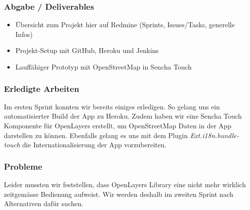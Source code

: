 \subsubsection{Abgabe / Deliverables}

\begin{itemize}
	\item Übersicht zum Projekt hier auf Redmine (Sprints, Issues/Tasks, generelle Infos)
	\item Projekt-Setup mit GitHub, Heroku und Jenkins
	\item Lauffähiger Prototyp mit OpenStreetMap in Sencha Touch
\end{itemize}

\subsubsection{Erledigte Arbeiten}
Im ersten Sprint konnten wir bereits einiges erledigen. So gelang uns ein automatisierter Build der App zu Heroku. Zudem haben wir eine Sencha Touch Komponente für OpenLayers erstellt, um OpenStreetMap Daten in der App darstellen zu können. Ebenfalls gelang es uns mit dem Plugin \emph{Ext.i18n.bundle-touch} die Internationalisierung der App vorzubereiten.

\subsubsection{Probleme}
Leider mussten wir feststellen, dass OpenLayers Library eine nicht mehr wirklich zeitgemässe Bedienung aufweist. Wir werden deshalb im zweiten Sprint nach Alternativen dafür suchen.